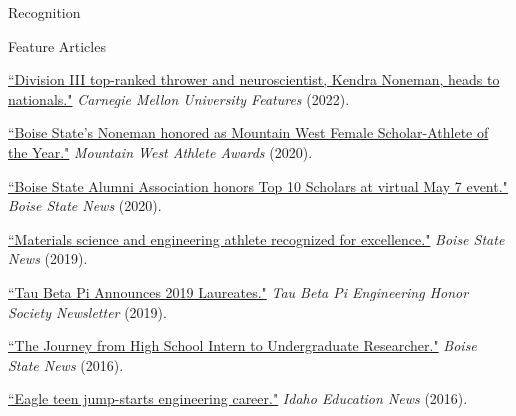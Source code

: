 \documentclass{resume} %
\begin{document}
\begin{rSection}{Recognition}
\begin{rSubsection3}{Feature Articles}{}{}{}
\item \href{https://www.cmu.edu/dietrich/news/news-stories/2022/may/hammer-kendra-noneman.html}{“Division III top-ranked thrower and neuroscientist, Kendra Noneman, heads to nationals."} \textit{Carnegie Mellon University Features} (2022).
\item \href{https://broncosports.com/news/2020/7/30/general-noneman-named-mw-scholar-athlete-of-the-year}{“Boise State's Noneman honored as Mountain West Female Scholar-Athlete of the Year."} \textit{Mountain West Athlete Awards} (2020).
\item \href{www.boisestate.edu/news/2020/04/23/boise-state-alumni-association-honors-top-10-scholars-at-virtual-may-7-event/}{“Boise State Alumni Association honors Top 10 Scholars at virtual May 7 event."} \textit{Boise State News} (2020).
\item \href{www.boisestate.edu/news/2019/10/02/mechanical-science-and-engineering-athlete-kendra-noneman-recognized-for-excellence/}{“Materials science and engineering athlete recognized for excellence."} \textit{Boise State News} (2019).
\item \href{www.tbp.org/memb/LaureatePDFs/2019.pdf}{“Tau Beta Pi Announces 2019 Laureates."} \textit{Tau Beta Pi Engineering Honor Society Newsletter} (2019).
\item \href{www.boisestate.edu/news/2016/06/29/yearlong-journey-high-school-intern-undergraduate-researcher/}{“The Journey from High School Intern to Undergraduate Researcher."} \textit{Boise State News} (2016).
\item \href{www.idahoednews.org/features/eagle-teen-jump-starts-engineering-career/}{“Eagle teen jump-starts engineering career."} \textit{Idaho Education News} (2016).
\end{rSubsection3}
\end{rSection}
\end{document}
